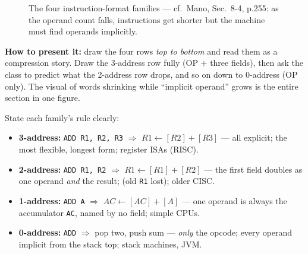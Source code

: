 \documentclass[11pt]{article}
\begin{document}
\begin{figure}[h]
  \centering
  \caption{The four instruction-format families --- cf.\ Mano, Sec.~8-4, p.255: as the operand count falls, instructions get shorter but the machine must find operands implicitly.}
  \label{fig:format-families}
\end{figure}

\textbf{How to present it:} draw the four rows \emph{top to bottom} and read them as a compression story. Draw the 3-address row fully (OP + three fields), then ask the class to predict what the 2-address row drops, and so on down to 0-address (OP only). The visual of words shrinking while ``implicit operand'' grows is the entire section in one figure.

State each family's rule clearly:
\begin{itemize}
  \item \textbf{3-address:} \texttt{ADD R1, R2, R3} $\Rightarrow$ $R1 \gets [R2]+[R3]$ --- all explicit; the most flexible, longest form; register ISAs (RISC).
  \item \textbf{2-address:} \texttt{ADD R1, R2} $\Rightarrow$ $R1 \gets [R1]+[R2]$ --- the first field doubles as one operand \emph{and} the result;  (old \texttt{R1} lost); older CISC.
  \item \textbf{1-address:} \texttt{ADD A} $\Rightarrow$ $AC \gets [AC]+[A]$ --- one operand is always the accumulator \texttt{AC}, named by no field; simple CPUs.
  \item \textbf{0-address:} \texttt{ADD} $\Rightarrow$ pop two, push sum --- \emph{only} the opcode; every operand implicit from the stack top; stack machines, JVM.
\end{itemize}
\end{document}
